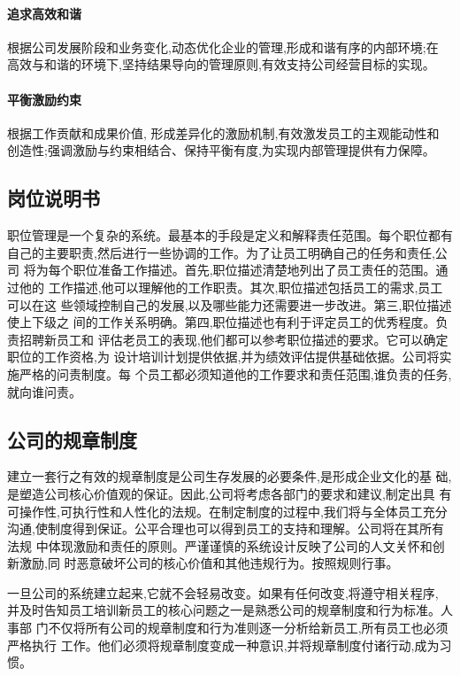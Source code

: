 \paragraph{追求高效和谐}
根据公司发展阶段和业务变化,动态优化企业的管理,形成和谐有序的内部环境;在
高效与和谐的环境下,坚持结果导向的管理原则,有效支持公司经营目标的实现。

\paragraph{平衡激励约束}
根据工作贡献和成果价值, 形成差异化的激励机制,有效激发员工的主观能动性和
创造性;强调激励与约束相结合、保持平衡有度,为实现内部管理提供有力保障。

\subsection{岗位说明书}
职位管理是一个复杂的系统。最基本的手段是定义和解释责任范围。每个职位都有
自己的主要职责,然后进行一些协调的工作。为了让员工明确自己的任务和责任,公司
将为每个职位准备工作描述。首先,职位描述清楚地列出了员工责任的范围。通过他的
工作描述,他可以理解他的工作职责。其次,职位描述包括员工的需求,员工可以在这
些领域控制自己的发展,以及哪些能力还需要进一步改进。第三,职位描述使上下级之
间的工作关系明确。第四,职位描述也有利于评定员工的优秀程度。负责招聘新员工和
评估老员工的表现,他们都可以参考职位描述的要求。它可以确定职位的工作资格,为
设计培训计划提供依据,并为绩效评估提供基础依据。公司将实施严格的问责制度。每
个员工都必须知道他的工作要求和责任范围,谁负责的任务,就向谁问责。

\subsection{公司的规章制度}
建立一套行之有效的规章制度是公司生存发展的必要条件,是形成企业文化的基
础,是塑造公司核心价值观的保证。因此,公司将考虑各部门的要求和建议,制定出具
有可操作性,可执行性和人性化的法规。在制定制度的过程中,我们将与全体员工充分
沟通,使制度得到保证。公平合理也可以得到员工的支持和理解。公司将在其所有法规
中体现激励和责任的原则。严谨谨慎的系统设计反映了公司的人文关怀和创新激励,同
时恶意破坏公司的核心价值和其他违规行为。按照规则行事。

一旦公司的系统建立起来,它就不会轻易改变。如果有任何改变,将遵守相关程序,
并及时告知员工培训新员工的核心问题之一是熟悉公司的规章制度和行为标准。人事部
门不仅将所有公司的规章制度和行为准则逐一分析给新员工,所有员工也必须严格执行
工作。他们必须将规章制度变成一种意识,并将规章制度付诸行动,成为习惯。

